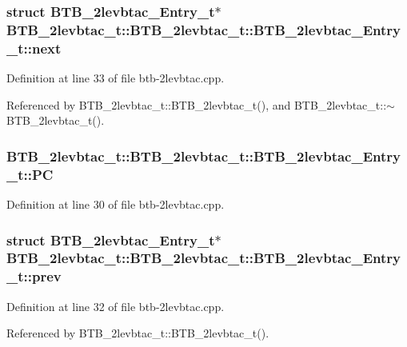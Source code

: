 \subsubsection[{next}]{\setlength{\rightskip}{0pt plus 5cm}struct {\bf BTB\_\-2levbtac\_\-Entry\_\-t}$\ast$ BTB\_\-2levbtac\_\-t::BTB\_\-2levbtac\_\-t::BTB\_\-2levbtac\_\-Entry\_\-t::next\hspace{0.3cm}{\tt  [read]}}\label{structBTB__2levbtac__t_1_1BTB__2levbtac__Entry__t_620110994bd5a00b90c10c132dff1106}




Definition at line 33 of file btb-2levbtac.cpp.

Referenced by BTB\_\-2levbtac\_\-t::BTB\_\-2levbtac\_\-t(), and BTB\_\-2levbtac\_\-t::$\sim$BTB\_\-2levbtac\_\-t().
\subsubsection[{PC}]{ BTB\_\-2levbtac\_\-t::BTB\_\-2levbtac\_\-t::BTB\_\-2levbtac\_\-Entry\_\-t::PC}\label{structBTB__2levbtac__t_1_1BTB__2levbtac__Entry__t_ff39fd3c85544a14f2cb33f2548a426b}




Definition at line 30 of file btb-2levbtac.cpp.
\subsubsection[{prev}]{\setlength{\rightskip}{0pt plus 5cm}struct {\bf BTB\_\-2levbtac\_\-Entry\_\-t}$\ast$ BTB\_\-2levbtac\_\-t::BTB\_\-2levbtac\_\-t::BTB\_\-2levbtac\_\-Entry\_\-t::prev\hspace{0.3cm}{\tt  [read]}}\label{structBTB__2levbtac__t_1_1BTB__2levbtac__Entry__t_576b49a4337a4c4807366dd4db740c08}




Definition at line 32 of file btb-2levbtac.cpp.

Referenced by BTB\_\-2levbtac\_\-t::BTB\_\-2levbtac\_\-t().
